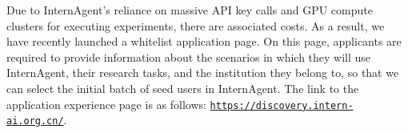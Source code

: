Due to InternAgent's reliance on massive API key calls and GPU compute clusters for executing experiments, there are associated costs. As a result, we have recently launched a whitelist application page. On this page, applicants are required to provide information about the scenarios in which they will use InternAgent, their research tasks, and the institution they belong to, so that we can select the initial batch of seed users in InternAgent. The link to the application experience page is as follows: \texttt{\url{https://discovery.intern-ai.org.cn/}}.



